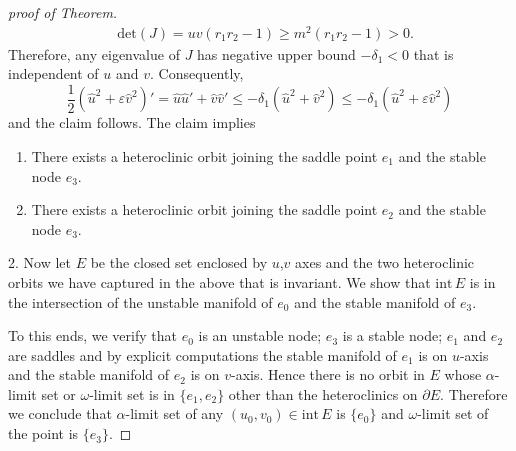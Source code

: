 \documentclass{amsart}
\theoremstyle{definition}
\numberwithin{equation}{section}
\def\ii{{\textrm{int}}\,}
\begin{document}
\begin{proof}[proof of Theorem]
\begin{align*}
 &\textrm{det}(J) = uv(r_1r_2-1) \ge m^2(r_1r_2-1) > 0.
\end{align*}
Therefore, any eigenvalue of $J$ has negative upper bound $-\delta_1<0$ that is independent of $u$ and $v$. Consequently, 
$$ \frac{1}{2} (\hat{u}^2 +  \varepsilon\hat{v}^2)' = \hat u \hat u' + \hat v \hat v' \le -\delta_1 (\hat{u}^2 + \hat{v}^2) \le -\delta_1(\hat{u}^2 + \varepsilon\hat{v}^2)$$
and the claim follows. The claim implies
\begin{enumerate}
 \item There exists a heteroclinic orbit joining the saddle point $e_1$ and the stable node $e_3$.
 \item There exists a heteroclinic orbit joining the saddle point $e_2$ and the stable node $e_3$.
\end{enumerate}

2. Now let $E$ be the closed set enclosed by $u$,$v$ axes and the two heteroclinic orbits we have captured in the above that is invariant. We show that $\ii E$ is in the intersection of the unstable manifold of $e_0$ and the stable manifold of $e_3$. 

To this ends, we verify that $e_0$ is an unstable node; $e_3$ is a stable node; $e_1$ and $e_2$ are saddles and by explicit computations the stable manifold of $e_1$ is on $u$-axis and the stable manifold of $e_2$ is on $v$-axis. Hence there is no orbit in $E$ whose $\alpha$-limit set or $\omega$-limit set is in $\{e_1,e_2\}$ other than the heteroclinics on $\partial E$. Therefore we conclude that $\alpha$-limit set of any $(u_0,v_0) \in\ii E$ is $\{e_0\}$ and $\omega$-limit set of the point is $\{e_3\}$.

% 



\end{proof}
\end{document}
